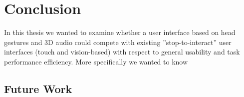 \chapter{Conclusion}
In this thesis we wanted to examine whether a user interface based on head gestures and 3D audio could compete with existing ”stop-to-interact” user interfaces (touch and vision-based) with respect to general usability and task performance efficiency. More specifically we wanted to know


\section{Future Work}



